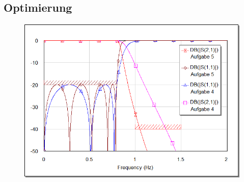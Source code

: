 \subsection{Optimierung}

\begin{figure}
    \centering
    \includegraphics[width=\linewidth]{images/graph-optimierung}
    \caption{}
    \label{fig:vor-nach-optimierung}
\end{figure}

